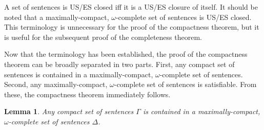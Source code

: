 \documentclass[12pt]{article}
\newtheorem{lemma}[theorem]{Lemma}
\theoremstyle{definition}
\theoremstyle{remark}
\begin{document}
A set of sentences is US/ES closed iff it is a US/ES closure of itself. It should be noted that a maximally-compact, $\omega$-complete set of sentences is US/ES closed. This terminology is unnecessary for the proof of the compactness theorem, but it is useful for the subsequent proof of the completeness theorem.

Now that the terminology has been established, the proof of the compactness theorem can be broadly separated in two parts. First, any compact set of sentences is contained in a maximally-compact, $\omega$-complete set of sentences. Second, any maximally-compact, $\omega$-complete set of sentences is satisfiable. From these, the compactness theorem immediately follows.

\begin{lemma}
	\label{lem:maximal}
	Any compact set of sentences $\Gamma$ is contained in a maximally-compact, $\omega$-complete set of sentences $\Delta$.
\end{lemma}
\end{document}
